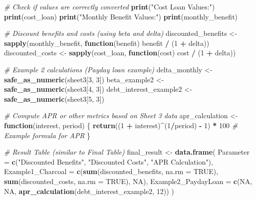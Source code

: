 \documentclass[
]{article}
\newenvironment{Shaded}{\begin{snugshade}}{\end{snugshade}}
\newcommand{\AttributeTok}[1]{\textcolor[rgb]{0.13,0.29,0.53}{#1}}
\newcommand{\CommentTok}[1]{\textcolor[rgb]{0.56,0.35,0.01}{\textit{#1}}}
\newcommand{\ConstantTok}[1]{\textcolor[rgb]{0.56,0.35,0.01}{#1}}
\newcommand{\ControlFlowTok}[1]{\textcolor[rgb]{0.13,0.29,0.53}{\textbf{#1}}}
\newcommand{\DecValTok}[1]{\textcolor[rgb]{0.00,0.00,0.81}{#1}}
\newcommand{\FunctionTok}[1]{\textcolor[rgb]{0.13,0.29,0.53}{\textbf{#1}}}
\newcommand{\NormalTok}[1]{#1}
\newcommand{\OtherTok}[1]{\textcolor[rgb]{0.56,0.35,0.01}{#1}}
\newcommand{\SpecialCharTok}[1]{\textcolor[rgb]{0.81,0.36,0.00}{\textbf{#1}}}
\newcommand{\StringTok}[1]{\textcolor[rgb]{0.31,0.60,0.02}{#1}}
\begin{document}
\begin{Shaded}
\begin{Highlighting}[]
  \CommentTok{\# Check if values are correctly converted}
  \FunctionTok{print}\NormalTok{(}\StringTok{"Cost Loan Values:"}\NormalTok{)}
  \FunctionTok{print}\NormalTok{(cost\_loan)}
  \FunctionTok{print}\NormalTok{(}\StringTok{"Monthly Benefit Values:"}\NormalTok{)}
  \FunctionTok{print}\NormalTok{(monthly\_benefit)}
  
  \CommentTok{\# Discount benefits and costs (using beta and delta)}
\NormalTok{  discounted\_benefits }\OtherTok{\textless{}{-}} \FunctionTok{sapply}\NormalTok{(monthly\_benefit, }\ControlFlowTok{function}\NormalTok{(benefit) benefit }\SpecialCharTok{/}\NormalTok{ (}\DecValTok{1} \SpecialCharTok{+}\NormalTok{ delta))}
\NormalTok{  discounted\_costs }\OtherTok{\textless{}{-}} \FunctionTok{sapply}\NormalTok{(cost\_loan, }\ControlFlowTok{function}\NormalTok{(cost) cost }\SpecialCharTok{/}\NormalTok{ (}\DecValTok{1} \SpecialCharTok{+}\NormalTok{ delta))}
  
  \CommentTok{\# Example 2 calculations (Payday loan example)}
\NormalTok{  delta\_monthly }\OtherTok{\textless{}{-}} \FunctionTok{safe\_as\_numeric}\NormalTok{(sheet3[}\DecValTok{3}\NormalTok{, }\DecValTok{3}\NormalTok{])}
\NormalTok{  beta\_example2 }\OtherTok{\textless{}{-}} \FunctionTok{safe\_as\_numeric}\NormalTok{(sheet3[}\DecValTok{4}\NormalTok{, }\DecValTok{3}\NormalTok{])}
\NormalTok{  debt\_interest\_example2 }\OtherTok{\textless{}{-}} \FunctionTok{safe\_as\_numeric}\NormalTok{(sheet3[}\DecValTok{5}\NormalTok{, }\DecValTok{3}\NormalTok{])}
  
  \CommentTok{\# Compute APR or other metrics based on Sheet 3 data}
\NormalTok{  apr\_calculation }\OtherTok{\textless{}{-}} \ControlFlowTok{function}\NormalTok{(interest, period) \{}
    \FunctionTok{return}\NormalTok{((}\DecValTok{1} \SpecialCharTok{+}\NormalTok{ interest)}\SpecialCharTok{\^{}}\NormalTok{(}\DecValTok{1}\SpecialCharTok{/}\NormalTok{period) }\SpecialCharTok{{-}} \DecValTok{1}\NormalTok{) }\SpecialCharTok{*} \DecValTok{100}  \CommentTok{\# Example formula for APR}
\NormalTok{  \}}
  
  \CommentTok{\# Result Table (similar to Final Table)}
\NormalTok{  final\_result }\OtherTok{\textless{}{-}} \FunctionTok{data.frame}\NormalTok{(}
    \AttributeTok{Parameter =} \FunctionTok{c}\NormalTok{(}\StringTok{"Discounted Benefits"}\NormalTok{, }\StringTok{"Discounted Costs"}\NormalTok{, }\StringTok{"APR Calculation"}\NormalTok{),}
    \AttributeTok{Example1\_Charcoal =} \FunctionTok{c}\NormalTok{(}\FunctionTok{sum}\NormalTok{(discounted\_benefits, }\AttributeTok{na.rm =} \ConstantTok{TRUE}\NormalTok{), }
                          \FunctionTok{sum}\NormalTok{(discounted\_costs, }\AttributeTok{na.rm =} \ConstantTok{TRUE}\NormalTok{), }
                          \ConstantTok{NA}\NormalTok{),}
    \AttributeTok{Example2\_PaydayLoan =} \FunctionTok{c}\NormalTok{(}\ConstantTok{NA}\NormalTok{, }\ConstantTok{NA}\NormalTok{, }\FunctionTok{apr\_calculation}\NormalTok{(debt\_interest\_example2, }\DecValTok{12}\NormalTok{))}
\NormalTok{  )}
  

\end{Highlighting}
\end{Shaded}
\end{document}
